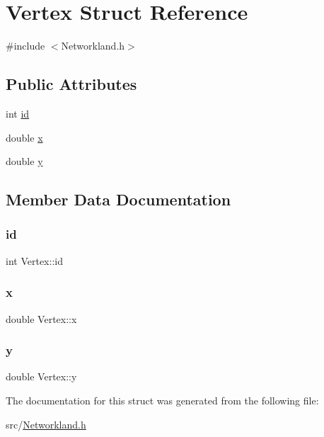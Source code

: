 \hypertarget{structVertex}{}\section{Vertex Struct Reference}
\label{structVertex}


{\ttfamily \#include $<$Networkland.\+h$>$}

\subsection*{Public Attributes}
\begin{DoxyCompactItemize}
\item 
int \hyperlink{structVertex_a2e69697726190f50c7fc040fb1ddac7a}{id}
\item 
double \hyperlink{structVertex_af2602132c3297d81bc9f8ee54867445b}{x}
\item 
double \hyperlink{structVertex_a7563c83da86f4a0831144bc823fec2b0}{y}
\end{DoxyCompactItemize}


\subsection{Member Data Documentation}
\mbox{\label{structVertex_a2e69697726190f50c7fc040fb1ddac7a}} 
\subsubsection{\texorpdfstring{id}{id}}
{\footnotesize\ttfamily int Vertex\+::id}

\mbox{\label{structVertex_af2602132c3297d81bc9f8ee54867445b}} 
\subsubsection{\texorpdfstring{x}{x}}
{\footnotesize\ttfamily double Vertex\+::x}

\mbox{\label{structVertex_a7563c83da86f4a0831144bc823fec2b0}} 
\subsubsection{\texorpdfstring{y}{y}}
{\footnotesize\ttfamily double Vertex\+::y}



The documentation for this struct was generated from the following file\+:\begin{DoxyCompactItemize}
\item 
src/\hyperlink{Networkland_8h}{Networkland.\+h}\end{DoxyCompactItemize}

